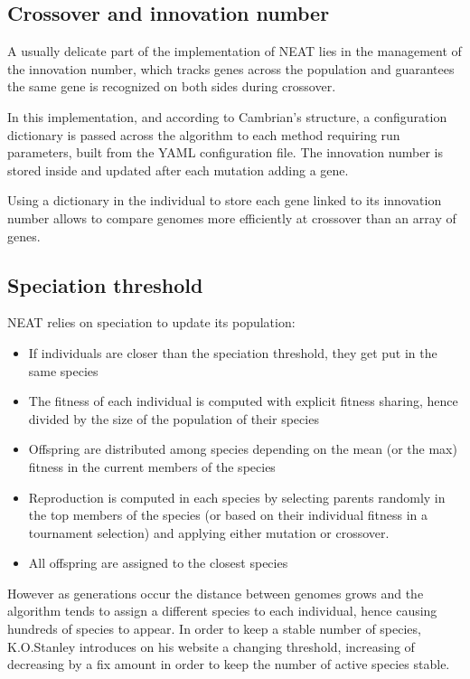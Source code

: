 \subsection{Crossover and innovation number}
A usually delicate part of the implementation of NEAT lies in the management of the innovation number, which tracks genes across the population and guarantees the same gene is recognized on both sides during crossover.

In this implementation, and according to Cambrian's structure, a configuration dictionary is passed across the algorithm to each method requiring run parameters, built from the YAML configuration file. The innovation number is stored inside and updated after each mutation adding a gene. 

Using a dictionary in the individual to store each gene linked to its innovation number allows to compare genomes more efficiently at crossover than an array of genes. 

\subsection{Speciation threshold}
NEAT relies on speciation to update its population:
\begin{itemize}
    \item If individuals are closer than the speciation threshold, they get put in the same species
    \item The fitness of each individual is computed with explicit fitness sharing, hence divided by the size of the population of their species
    \item Offspring are distributed among species depending on the mean (or the max) fitness in the current members of the species
    \item Reproduction is computed in each species by selecting parents randomly in the top members of the species (or based on their individual fitness in a tournament selection) and applying either mutation or crossover.
    \item All offspring are assigned to the closest species
\end{itemize}

However as generations occur the distance between genomes grows and the algorithm tends to assign a different species to each individual, hence causing hundreds of species to appear. In order to keep a stable number of species, K.O.Stanley introduces on his website a changing threshold, increasing of decreasing by a fix amount in order to keep the number of active species stable. 

